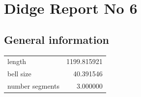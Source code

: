 \documentclass{article}
\begin{document}
\begin{centering}
\begin{figure}[!htb]
\end{figure}
\end{centering}
\section{Didge Report No 6}

\subsection{General information}
\begin{centering}

\begin{figure}[!htb]
\end{figure}
\begin{tabular}{lr}
\toprule
         length & 1199.815921 \\
      bell size &   40.391546 \\
number segments &    3.000000 \\
\bottomrule
\end{tabular}
\end{centering}
\end{document}
